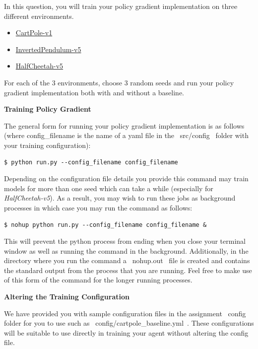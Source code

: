 \item {}

In this question, you will train your policy gradient implementation on three different environments.

\begin{itemize}
	\item \href{https://www.gymlibrary.dev/environments/classic_control/cart_pole/}{CartPole-v1}
	\item \href{https://www.gymlibrary.dev/environments/mujoco/inverted_pendulum/}{InvertedPendulum-v5}
	\item \href{https://www.gymlibrary.dev/environments/mujoco/half_cheetah/}{HalfCheetah-v5}
\end{itemize}

For each of the 3 environments, choose 3 random seeds and run your policy gradient implementation both with and without a baseline.

\clearpage
\textbf{Training Policy Gradient}

The general form for running your policy gradient implementation is as follows (where config\_filename is the name of a yaml file in the ~src/config~ folder with your training configuration):

\begin{lstlisting}
$ python run.py --config_filename config_filename
\end{lstlisting}

Depending on the configuration file details you provide this command may train models for more than one seed which can take a while (especially for \textit{HalfCheetah-v5}). As a result, you may wish to run these jobs as background processes in which case you may run the command as follows:

\begin{lstlisting}
$ nohup python run.py --config_filename config_filename &
\end{lstlisting}

This will prevent the python process from ending when you close your terminal window as well as running the command in the background. Additionally, in the directory where you run the command a ~nohup.out~ file is created and contains the standard output from the process that you are running. Feel free to make use of this form of the command for the longer running processes.

\textbf{Altering the Training Configuration}

We have provided you with sample configuration files in the assignment ~config~ folder for you to use such as ~config/cartpole_baseline.yml~. These configurations will be suitable to use directly in training your agent without altering the config file.

